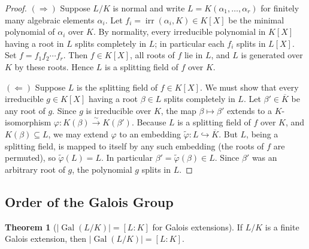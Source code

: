 \documentclass[12pt,a4paper,openany]{book}
\theoremstyle{definition}
\newtheorem{theorem}{Theorem}[chapter]
\theoremstyle{remark}
\DeclareMathOperator{\Gal}{Gal}
\DeclareMathOperator{\irr}{irr}
\begin{document}
\begin{proof}
$(\Longrightarrow)$\;
Suppose $L/K$ is normal and write $L=K(\alpha_{1},\dots,\alpha_{r})$
for finitely many algebraic elements $\alpha_{i}$.  Let
$f_{i}=\irr(\alpha_{i},K)\in K[X]$ be the minimal polynomial of $\alpha_{i}$
over $K$.  By normality, every irreducible polynomial in $K[X]$ having a root
in $L$ splits completely in $L$; in particular each $f_{i}$ splits in $L[X]$.
Set $f=f_{1}f_{2}\cdots f_{r}$.  Then $f\in K[X]$, all roots of $f$ lie
in $L$, and $L$ is generated over $K$ by these roots.  Hence $L$ is a
splitting field of $f$ over $K$.

$(\Longleftarrow)$\;
Suppose $L$ is the splitting field of $f\in K[X]$.  We must show that
every irreducible $g\in K[X]$ having a root $\beta\in L$ splits
completely in $L$.  Let $\beta'\in\overline{K}$ be any root of $g$.
Since $g$ is irreducible over $K$, the map $\beta\mapsto\beta'$ extends
to a $K$-isomorphism $\varphi\colon K(\beta)\xrightarrow{\;\sim\;}K(\beta')$.
Because $L$ is a splitting field of $f$ over $K$, and $K(\beta)\subseteq L$,
we may extend $\varphi$ to an embedding $\tilde{\varphi}\colon L\hookrightarrow\overline{K}$.
But $L$, being a splitting field, is mapped to itself by any such embedding
(the roots of $f$ are permuted), so $\tilde{\varphi}(L)=L$.  In particular
$\beta'=\tilde{\varphi}(\beta)\in L$.  Since $\beta'$ was an arbitrary root
of $g$, the polynomial $g$ splits in $L$.
\end{proof}

\subsection{Order of the Galois Group}
\label{subsec:order-galois}

\begin{theorem}[{$|\Gal(L/K)|=[L:K]$ for Galois extensions}]
\label{thm:gal-order}
If $L/K$ is a finite Galois extension, then
$|\Gal(L/K)|=[L:K]$.
\end{theorem}
\end{document}
